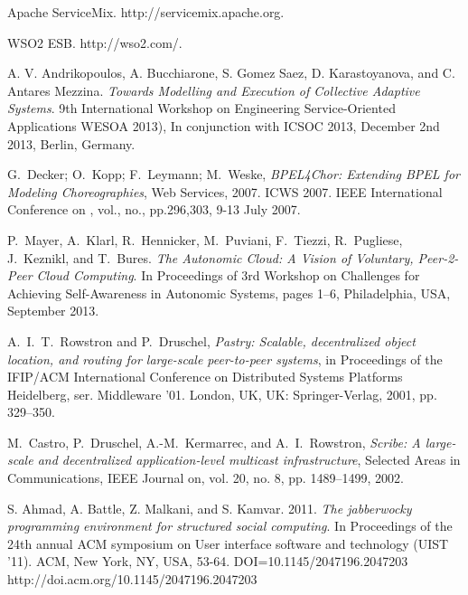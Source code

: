 \documentclass{llncs}
\begin{document}
\begin{thebibliography}{1}
Apache ServiceMix. http://servicemix.apache.org.

WSO2 ESB. http://wso2.com/.

A. V. Andrikopoulos, A. Bucchiarone, S. Gomez Saez, D. Karastoyanova, and C. Antares Mezzina. \emph{Towards Modelling and Execution of Collective Adaptive Systems}. 9th International Workshop on Engineering Service-Oriented Applications WESOA 2013), In conjunction with ICSOC 2013, December 2nd 2013, Berlin, Germany.

G.~Decker; O.~Kopp; F.~Leymann; M.~Weske, \emph{BPEL4Chor: Extending BPEL for Modeling Choreographies}, Web Services, 2007. ICWS 2007. IEEE International Conference on , vol., no., pp.296,303, 9-13 July 2007.





P.~Mayer, A.~Klarl, R.~Hennicker, M.~Puviani, F.~Tiezzi, R.~Pugliese, J.~Keznikl, and T.~Bures. \emph{The Autonomic Cloud: A Vision of Voluntary, Peer-2-Peer Cloud Computing}. In Proceedings of 3rd Workshop on Challenges for Achieving Self-Awareness in Autonomic Systems, pages 1–6, Philadelphia, USA, September 2013.

A.~I.~T.~Rowstron and P.~Druschel, \emph{Pastry: Scalable, decentralized object location, and routing for large-scale peer-to-peer systems}, in Proceedings of the IFIP/ACM International Conference on Distributed Systems Platforms Heidelberg, ser. Middleware ’01. London, UK, UK: Springer-Verlag, 2001, pp. 329–350.

M.~Castro, P.~Druschel, A.-M.~Kermarrec, and A.~I.~Rowstron, \emph{Scribe: A large-scale and decentralized application-level multicast infrastructure}, Selected Areas in Communications, IEEE Journal on, vol. 20, no. 8, pp. 1489–1499, 2002.

S. Ahmad, A. Battle, Z. Malkani, and S. Kamvar. 2011. \emph{The jabberwocky programming environment for structured social computing}. In Proceedings of the 24th annual ACM symposium on User interface software and technology (UIST '11). ACM, New York, NY, USA, 53-64. DOI=10.1145/2047196.2047203 http://doi.acm.org/10.1145/2047196.2047203


\end{thebibliography}
\end{document}
